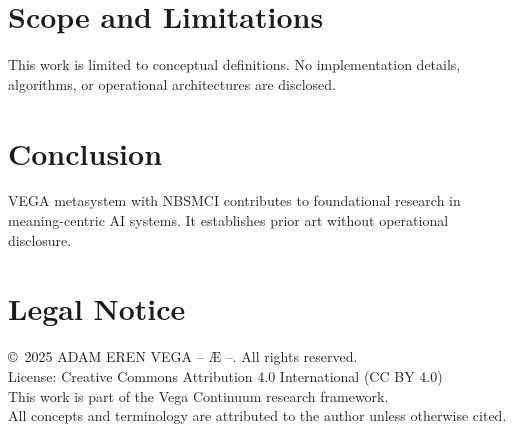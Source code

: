 \documentclass[12pt,a4paper]{article}
\begin{document}
\section{Scope and Limitations}
This work is limited to conceptual definitions. No implementation details, algorithms, or operational architectures are disclosed.

\section{Conclusion}
VEGA metasystem with NBSMCI contributes to foundational research in meaning-centric AI systems. It establishes prior art without operational disclosure.

\section*{Legal Notice}
\copyright\ 2025 ADAM EREN VEGA – Æ –. All rights reserved.\\
License: Creative Commons Attribution 4.0 International (CC BY 4.0)\\
This work is part of the Vega Continuum research framework.\\
All concepts and terminology are attributed to the author unless otherwise cited.
\end{document}
